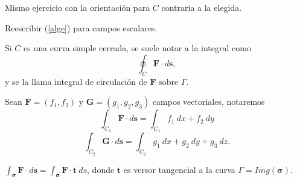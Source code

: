  \begin{tarea} Mismo ejercicio con la orientaci\'on para $C$ contraria  a la elegida. 
 \end{tarea}

\begin{tarea}Reescribir  (\ref{alge})  para campos escalares. 
\end{tarea}


\begin{definition}
    Si $C$  es una curva simple cerrada,  se suele notar a la integral como
    \[
        \oint_{C}\mathbf{F}\cdot d\mathbf{s},  
    \]  y se la llama integral de circulaci\'on de $\mathbf{F}$ sobre $\Gamma$.
\end{definition}


 \begin{nota}\label{not_int} Sean  $\mathbf{F}=(f_1, f_2)$ y $\mathbf{G}=(g_1, g_2, g_3)$ campos vectoriales, notaremos $$ \int_{C_1}\mathbf{F}\cdot d\mathbf{s} =  \int_{ C_1}f_1\:dx+ f_2 \:dy$$ 
  $$ \int_{C_2}\mathbf{G}\cdot d\mathbf{s} =  \int_{C_2} g_1\:dx+g_2\:dy+g_3\:dz.$$
 \end{nota}
 
 \begin{nota} 
  $\int_{\boldsymbol{\sigma}}\mathbf{F}\cdot d\mathbf{s}=\int_{\boldsymbol{\sigma}}\mathbf{F}\cdot{\mathbf{t}}\:ds$,  donde ${\mathbf{t}}$ es versor tangencial a la curva  $\Gamma = Img(\boldsymbol{\sigma}).$
 \end{nota}
